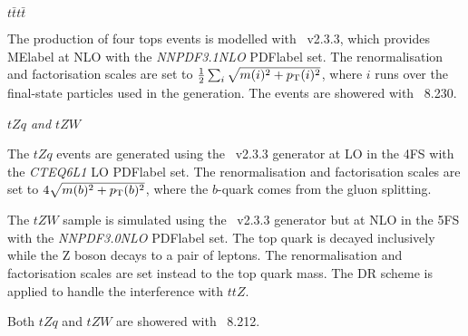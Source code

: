 \textit{$t\bar{t}t\bar{t}$}

The production of four tops events is modelled with \MGMCatNLO~v2.3.3, which provides \acrshort{MElabel} at NLO with the \textit{NNPDF3.1NLO} \acrshort{PDFlabel} set. The renormalisation and factorisation scales are set to $\frac{1}{2}\sum_i\sqrt{m(i)^2+p_{\text{T}}(i)^2}$, where $i$ runs over the final-state particles used in the generation. The events are showered with \PYTHIA~8.230.

\textit{$tZq$ and $tZW$}

The $tZq$ events are generated using the \MGMCatNLO~v2.3.3 generator at LO in the 4FS with the \textit{CTEQ6L1} LO \acrshort{PDFlabel} set. The renormalisation and factorisation scales are set to $4\sqrt{m(b)^2+p_{\text{T}}(b)^2}$, where the $b$-quark comes from the gluon splitting.

The $tZW$ sample is simulated using the \MGMCatNLO~v2.3.3 generator but at NLO in the 5FS with the \textit{NNPDF3.0NLO} \acrshort{PDFlabel} set. The top quark is decayed inclusively while the Z boson decays to a pair of leptons. The renormalisation and factorisation scales are set instead to the top quark mass. The DR scheme is applied to handle the interference with $ttZ$.

Both $tZq$ and $tZW$ are showered with \PYTHIA~8.212.